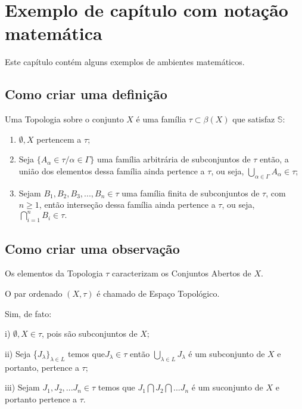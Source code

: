 \chapter[Exemplo de capítulo com notação matemática]{Exemplo de capítulo com notação matemática}

Este capítulo contém alguns exemplos de ambientes matemáticos.

\section{Como criar uma definição}

\begin{defi}
Uma Topologia sobre o conjunto $X$ é uma família $\tau
\subset \beta(X)$ que satisfaz $ \mathbb{S} $:
\begin{enumerate}
 \item$\emptyset,X$ pertencem a $\tau;$
 \item Seja  $\{A_{\alpha} \in \tau /\alpha \in \Gamma\}$
 uma família arbitrária de subconjuntos de  $\tau$ então, a união dos elementos dessa família ainda pertence a  $\tau$, ou seja, $\bigcup \limits_{\alpha \in \Gamma} A_{\alpha}\in\tau;$
 \item Sejam $B_{1},B_{2},B_{3},..., B_{n} \in \tau$ uma família finita de subconjuntos de $\tau$, com $n \geq 1$, então
 interseção dessa família ainda pertence a $\tau$, ou seja, $\bigcap\limits_{i=1}^{n} B_{i}\in \tau.$
\end{enumerate}
\end{defi}

\section{Como criar uma observação}

\begin{obs}

\item Os elementos da Topologia  $\tau$ caracterizam os Conjuntos Abertos de $X.$

\item O par ordenado $(X,\tau)$ é chamado de Espaço Topológico.

Sim, de fato:
\item[i)]$\emptyset, X \in \tau$, pois são subconjuntos de $X;$
\item[ii)]Seja \{$J_{\lambda}\}_{\lambda\in L}$ temos que$J_{\lambda}\in \tau$ então $\bigcup\limits_{\lambda\in L} J_{\lambda}$ é
    um subconjunto de $X$ e portanto, pertence a $\tau;$
\item[iii)] Sejam $J_{1},J_{2},...J_{n} \in \tau$ temos que $J_{1}\bigcap J_{2}\bigcap ...J_{n}$ é um suconjunto de $X$ e portanto pertence a $\tau.$

\end{obs}

